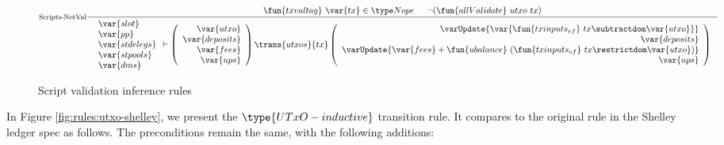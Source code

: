 \begin{figure}[htb]
\begin{equation}
{    }
  \end{equation}
  \begin{equation}
    \inference[Scripts-NotVal]
    {
    \fun{txvaltag}~\var{tx} \in \Nope &
    \neg (\fun{allValidate}~{utxo}~{tx} ) \\
    }
    {
    \begin{array}{l}
      \var{slot}\\
      \var{pp}\\
      \var{stdelegs}\\
      \var{stpools}\\
      \var{dms}\\
    \end{array}
      \vdash
      \left(
      \begin{array}{r}
        \var{utxo} \\
        \var{deposits} \\
        \var{fees} \\
        \var{ups} \\
      \end{array}
      \right)
      \trans{utxos}{tx}
      \left(
      \begin{array}{r}
        \varUpdate{\var{\fun{txinputs_{vf}}~{tx} \subtractdom \var{utxo}}}  \\
        \var{deposits} \\
        \varUpdate{\var{fees} + \fun{ubalance}~(\fun{txinputs_{vf}}~{tx}\restrictdom \var{utxo})} \\
        \var{ups} \\
      \end{array}
      \right)
    }
  \end{equation}
  \caption{Script validation inference rules}
  \label{fig:rules:utxo-scrval}
\end{figure}

In Figure \ref{fig:rules:utxo-shelley}, we present the $\type{UTxO-inductive}$
transition rule. It compares to the original rule in the Shelley ledger spec
as follows. The preconditions remain the same, with the following additions:

